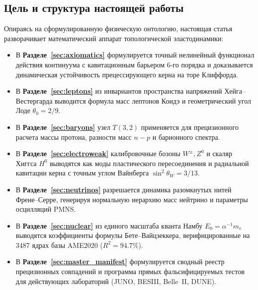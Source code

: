 \documentclass[11pt,a4paper]{article}
\theoremstyle{definition}
\theoremstyle{remark}
\begin{document}
\subsection{Цель и структура настоящей работы}
Опираясь на сформулированную физическую онтологию, настоящая статья разворачивает математический аппарат топологической эластодинамики:
\begin{itemize}
    \item В \textbf{Разделе~\ref{sec:axiomatics}} формулируется точный нелинейный функционал действия континуума с кавитационным барьером 6-го порядка и доказывается динамическая устойчивость прецессирующего керна на торе Клиффорда.
    \item В \textbf{Разделе~\ref{sec:leptons}} из инвариантов пространства напряжений Хейга--Вестергарда выводится формула масс лептонов Коидэ и геометрический угол Лоде $\theta_0 = 2/9$.
    \item В \textbf{Разделе~\ref{sec:baryons}} узел $T(3,2)$ применяется для прецизионного расчета массы протона, разности масс $n-p$ и барионного спектра.
    \item В \textbf{Разделе~\ref{sec:electroweak}} калибровочные бозоны $W^\pm, Z^0$ и скаляр Хиггса $H^0$ выводятся как моды пластического пересоединения и радиальной кавитации керна с точным углом Вайнберга $\sin^2\theta_W = 3/13$.
    \item В \textbf{Разделе~\ref{sec:neutrinos}} разрешается динамика разомкнутых нитей Френе--Серре, генерируя нормальную иерархию масс нейтрино и параметры осцилляций PMNS.
    \item В \textbf{Разделе~\ref{sec:nuclear}} из единого масштаба кванта Намбу $E_0 = \alpha^{-1} m_e$ выводятся коэффициенты формулы Бете--Вайцзеккера, верифицированные на 3487 ядрах базы AME2020 ($R^2 = 94.7\%$).
    \item В \textbf{Разделе~\ref{sec:master_manifest}} формулируется сводный реестр прецизионных совпадений и программа прямых фальсифицируемых тестов для действующих лабораторий (JUNO, BESIII, Belle~II, DUNE).
\end{itemize}


\end{document}
